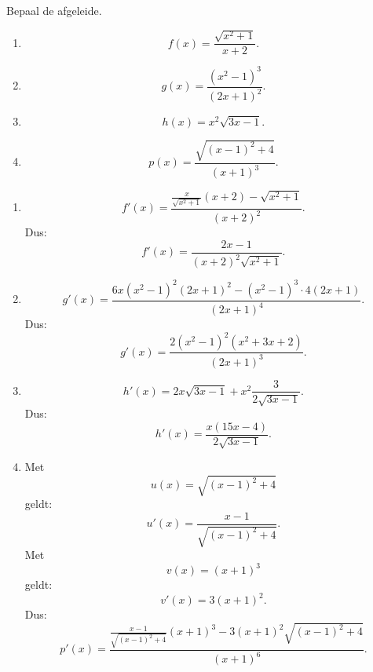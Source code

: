 \documentclass{ximera}
\begin{document}
\begin{oefening}[Afleiden]{\oefU\ESS}

Bepaal de afgeleide.

\begin{enumerate}
  \item \[f(x)=\frac{\sqrt{x^2+1}}{x+2}.\]
  \item \[g(x)=\frac{(x^2-1)^3}{(2x+1)^2}.\]
  \item \[h(x)=x^2\sqrt{3x-1}.\]
  \item \[p(x)=\frac{\sqrt{(x-1)^2+4}}{(x+1)^3}.\]
\end{enumerate}

\begin{oplossing}
\begin{enumerate}
  \item
  \[
  f'(x)=
  \frac{\frac{x}{\sqrt{x^2+1}}(x+2)-\sqrt{x^2+1}}{(x+2)^2}.
  \]
  Dus:
  \[\boxed{f'(x)=\frac{2x-1}{(x+2)^2\sqrt{x^2+1}}.}\]

  \item
  \[
  g'(x)=
  \frac{6x(x^2-1)^2(2x+1)^2-(x^2-1)^3\cdot4(2x+1)}
       {(2x+1)^4}.
  \]
  Dus:
  \[\boxed{g'(x)=\frac{2(x^2-1)^2(x^2+3x+2)}{(2x+1)^3}.}\]

  \item
  \[
  h'(x)=2x\sqrt{3x-1}+x^2\frac{3}{2\sqrt{3x-1}}.
  \]
  Dus:
  \[\boxed{h'(x)=\frac{x(15x-4)}{2\sqrt{3x-1}}.}\]

  \item
  Met
  \[
  u(x)=\sqrt{(x-1)^2+4}
  \]
  geldt:
  \[
  u'(x)=\frac{x-1}{\sqrt{(x-1)^2+4}}.
  \]
  Met
  \[
  v(x)=(x+1)^3
  \]
  geldt:
  \[
  v'(x)=3(x+1)^2.
  \]
  Dus:
  \[
  p'(x)=
  \frac{
  \frac{x-1}{\sqrt{(x-1)^2+4}}(x+1)^3
  -
  3(x+1)^2\sqrt{(x-1)^2+4}
  }
  {(x+1)^6}.
  \]
\end{enumerate}
\end{oplossing}

\end{oefening}
\end{document}
